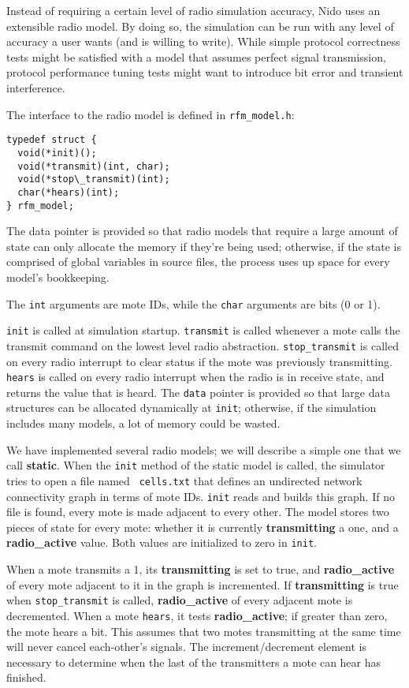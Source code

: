 \documentclass[10pt]{article}
\begin{document}
Instead of requiring a certain level of radio simulation accuracy,
Nido uses an extensible radio model. By doing so, the simulation can
be run with any level of accuracy a user wants (and is willing to
write). While simple protocol correctness tests might be satisfied
with a model that assumes perfect signal transmission, protocol
performance tuning tests might want to introduce bit error and
transient interference.

The interface to the radio model is defined in {\tt rfm\_model.h}:

\begin{verbatim}
typedef struct {
  void(*init)();
  void(*transmit)(int, char);
  void(*stop\_transmit)(int);
  char(*hears)(int);
} rfm_model;
\end{verbatim}

The data pointer is provided so that radio models that require a large
amount of state can only allocate the memory if they're being used;
otherwise, if the state is comprised of global variables in source
files, the process uses up space for every model's bookkeeping.

The {\tt int} arguments are mote IDs, while the {\tt char} arguments
are bits (0 or 1).

{\tt init} is called at simulation startup. {\tt transmit} is called
whenever a mote calls the transmit command on the lowest level radio
abstraction. {\tt stop\_transmit} is called on every radio interrupt
to clear status if the mote was previously transmitting. {\tt hears}
is called on every radio interrupt when the radio is in receive state,
and returns the value that is heard. The {\tt data} pointer is
provided so that large data structures can be allocated dynamically at
{\tt init}; otherwise, if the simulation includes many models, a lot
of memory could be wasted.

We have implemented several radio models; we will describe a simple
one that we call {\bf static}. When the {\tt init} method of the
static model is called, the simulator tries to open a file named {\tt
cells.txt} that defines an undirected network connectivity graph in
terms of mote IDs. {\tt init} reads and builds this graph. If no file
is found, every mote is made adjacent to every other. The model stores
two pieces of state for every mote: whether it is currently {\bf
transmitting }a one, and a {\bf radio\_active} value. Both values are
initialized to zero in {\tt init}.

When a mote transmits a 1, its {\bf transmitting} is set to true, and
{\bf radio\_active} of every mote adjacent to it in the graph is
incremented. If {\bf transmitting} is true when {\tt stop\_transmit}
is called, {\bf radio\_active} of every adjacent mote is
decremented. When a mote {\tt hears}, it tests {\bf radio\_active}; if
greater than zero, the mote hears a bit. This assumes that two motes
transmitting at the same time will never cancel each-other's
signals. The increment/decrement element is necessary to determine
when the last of the transmitters a mote can hear has finished.
\end{document}
